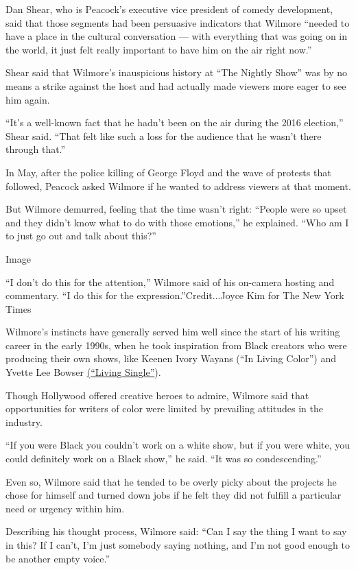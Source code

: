 Dan Shear, who is Peacock's executive vice president of comedy
development, said that those segments had been persuasive indicators
that Wilmore ``needed to have a place in the cultural conversation ---
with everything that was going on in the world, it just felt really
important to have him on the air right now.''

Shear said that Wilmore's inauspicious history at ``The Nightly Show''
was by no means a strike against the host and had actually made viewers
more eager to see him again.

``It's a well-known fact that he hadn't been on the air during the 2016
election,'' Shear said. ``That felt like such a loss for the audience
that he wasn't there through that.''

In May, after the police killing of George Floyd and the wave of
protests that followed, Peacock asked Wilmore if he wanted to address
viewers at that moment.

But Wilmore demurred, feeling that the time wasn't right: ``People were
so upset and they didn't know what to do with those emotions,'' he
explained. ``Who am I to just go out and talk about this?''

Image

``I don't do this for the attention,'' Wilmore said of his on-camera
hosting and commentary. ``I do this for the expression.''Credit...Joyce
Kim for The New York Times

Wilmore's instincts have generally served him well since the start of
his writing career in the early 1990s, when he took inspiration from
Black creators who were producing their own shows, like Keenen Ivory
Wayans (``In Living Color'') and Yvette Lee Bowser
\href{https://www.youtube.com/watch?v=jnD2mdaxUAo}{(``Living Single''}).

Though Hollywood offered creative heroes to admire, Wilmore said that
opportunities for writers of color were limited by prevailing attitudes
in the industry.

``If you were Black you couldn't work on a white show, but if you were
white, you could definitely work on a Black show,'' he said. ``It was so
condescending.''

Even so, Wilmore said that he tended to be overly picky about the
projects he chose for himself and turned down jobs if he felt they did
not fulfill a particular need or urgency within him.

Describing his thought process, Wilmore said: ``Can I say the thing I
want to say in this? If I can't, I'm just somebody saying nothing, and
I'm not good enough to be another empty voice.''


